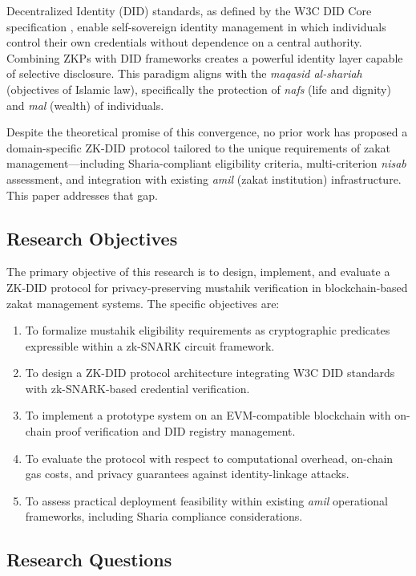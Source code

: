 \documentclass[conference]{IEEEtran}
\begin{document}
Decentralized Identity (DID) standards, as defined by the W3C DID Core specification \cite{sporny2022did}, enable self-sovereign identity management in which individuals control their own credentials without dependence on a central authority. Combining ZKPs with DID frameworks creates a powerful identity layer capable of selective disclosure. This paradigm aligns with the \textit{maqasid al-shariah} (objectives of Islamic law), specifically the protection of \textit{nafs} (life and dignity) and \textit{mal} (wealth) of individuals.

Despite the theoretical promise of this convergence, no prior work has proposed a domain-specific ZK-DID protocol tailored to the unique requirements of zakat management---including Sharia-compliant eligibility criteria, multi-criterion \textit{nisab} assessment, and integration with existing \textit{amil} (zakat institution) infrastructure. This paper addresses that gap.

\subsection{Research Objectives}

The primary objective of this research is to design, implement, and evaluate a ZK-DID protocol for privacy-preserving mustahik verification in blockchain-based zakat management systems. The specific objectives are:

\begin{enumerate}
    \item To formalize mustahik eligibility requirements as cryptographic predicates expressible within a zk-SNARK circuit framework.
    \item To design a ZK-DID protocol architecture integrating W3C DID standards with zk-SNARK-based credential verification.
    \item To implement a prototype system on an EVM-compatible blockchain with on-chain proof verification and DID registry management.
    \item To evaluate the protocol with respect to computational overhead, on-chain gas costs, and privacy guarantees against identity-linkage attacks.
    \item To assess practical deployment feasibility within existing \textit{amil} operational frameworks, including Sharia compliance considerations.
\end{enumerate}

\subsection{Research Questions}
\end{document}
